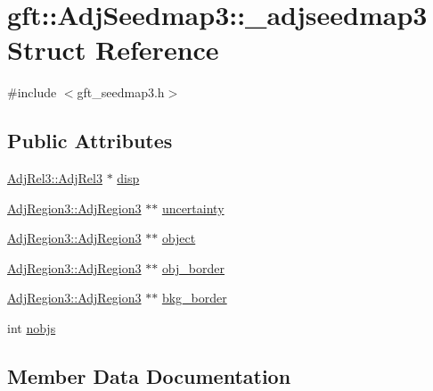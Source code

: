 \hypertarget{structgft_1_1AdjSeedmap3_1_1__adjseedmap3}{}\section{gft\+:\+:Adj\+Seedmap3\+:\+:\+\_\+adjseedmap3 Struct Reference}
\label{structgft_1_1AdjSeedmap3_1_1__adjseedmap3}


{\ttfamily \#include $<$gft\+\_\+seedmap3.\+h$>$}

\subsection*{Public Attributes}
\begin{DoxyCompactItemize}
\item 
\hyperlink{namespacegft_1_1AdjRel3_a0d54e2f148bf5636f3a3faf70d4eb5ae}{Adj\+Rel3\+::\+Adj\+Rel3} $\ast$ \hyperlink{structgft_1_1AdjSeedmap3_1_1__adjseedmap3_a6f45e70cf139e2d719329d24d640ddc4}{disp}
\item 
\hyperlink{namespacegft_1_1AdjRegion3_a50e41e32ed23c8a2c4027f2ea29d501b}{Adj\+Region3\+::\+Adj\+Region3} $\ast$$\ast$ \hyperlink{structgft_1_1AdjSeedmap3_1_1__adjseedmap3_a52a87c951c6dc129f925c652464ec475}{uncertainty}
\item 
\hyperlink{namespacegft_1_1AdjRegion3_a50e41e32ed23c8a2c4027f2ea29d501b}{Adj\+Region3\+::\+Adj\+Region3} $\ast$$\ast$ \hyperlink{structgft_1_1AdjSeedmap3_1_1__adjseedmap3_a13f54f99f6a0b373577e69675ba3f989}{object}
\item 
\hyperlink{namespacegft_1_1AdjRegion3_a50e41e32ed23c8a2c4027f2ea29d501b}{Adj\+Region3\+::\+Adj\+Region3} $\ast$$\ast$ \hyperlink{structgft_1_1AdjSeedmap3_1_1__adjseedmap3_a38b58c0d268fd157dbdd17b1d4407d7a}{obj\+\_\+border}
\item 
\hyperlink{namespacegft_1_1AdjRegion3_a50e41e32ed23c8a2c4027f2ea29d501b}{Adj\+Region3\+::\+Adj\+Region3} $\ast$$\ast$ \hyperlink{structgft_1_1AdjSeedmap3_1_1__adjseedmap3_afef39996c0e26745d64e12ad10a5d4e8}{bkg\+\_\+border}
\item 
int \hyperlink{structgft_1_1AdjSeedmap3_1_1__adjseedmap3_ae42ccc829e5c8fff7a2033bab83733bc}{nobjs}
\end{DoxyCompactItemize}


\subsection{Member Data Documentation}
